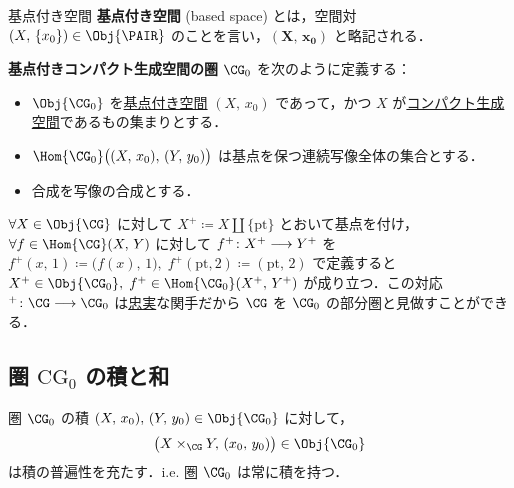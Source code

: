 \documentclass[algtopo_main]{subfiles}
\begin{document}
\begin{mydef}[label=def:bases-space]{基点付き空間}
    \textbf{基点付き空間} (based space) とは，空間対 $(X,\, \{x_0\}) \in \Obj{\PAIR}$ のことを言い，$\bm{(X,\, x_0)}$ と略記される．
\end{mydef}

\textbf{基点付きコンパクト生成空間の圏} $\CG_0$ を次のように定義する：
\begin{itemize}
    \item $\Obj{\CG_0}$ を\hyperref[def:bases-space]{基点付き空間} $(X,\, x_0)$ であって，かつ $X$ が\hyperref[def:CG]{コンパクト生成空間}であるもの集まりとする．
    \item $\Hom{\CG_0} \bigl( (X,\, x_0),\, (Y,\, y_0) \bigr)$ は基点を保つ連続写像全体の集合とする．
    \item 合成を写像の合成とする．
\end{itemize}

$\forall X \in \Obj{\CG}$ に対して $X^+ \coloneqq X \amalg \{\mathrm{pt}\}$ とおいて基点を付け，
$\forall f \in \Hom{\CG}(X,\, Y)$ に対して $f^+ \colon X^+ \longrightarrow Y^+$ を $f^+(x,\, 1) \coloneqq \bigl(f(x),\, 1\bigr),\; f^+(\mathrm{pt}, 2) \coloneqq (\mathrm{pt},\, 2)$ で定義すると
$X^+ \in \Obj{\CG_0},\; f^+ \in \Hom{\CG_0} (X^+,\, Y^+)$ が成り立つ．この対応 ${}^+ \colon \CG \lto \CG_0$ は\hyperref[def:faithful]{忠実}な関手だから $\CG$ を $\CG_0$ の部分圏と見做すことができる．

\subsection{圏 $\mathrm{CG}_0$ の積と和}

\begin{myprop}[label=prop:CG0-product]{圏 $\CG_0$ の積}
    $(X,\, x_0),\, (Y,\, y_0) \in \Obj{\CG_0}$ に対して，
    \begin{align}
        \bigl(X \times_{\CG} Y,\, (x_0,\, y_0)\bigr) \in \Obj{\CG_0}
    \end{align}
    は積の普遍性を充たす．i.e. 圏 $\CG_0$ は常に積を持つ．
\end{myprop}
\end{document}
